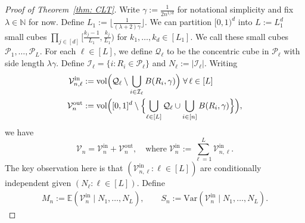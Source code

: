 \documentclass[11pt]{article}
\newcommand{\vol}{\mathrm{vol}}
\newcommand{\var}{\mathrm{Var}}
\begin{document}
\begin{proof}[Proof of Theorem~\ref{thm: CLT}]
Write $\gamma:=\frac{1}{2n^{1/d}}$ for notational simplicity and fix $\lambda\in\mathbb{N}$ for now. Define $L_1:=\lfloor\frac{1}{(\lambda+2)\gamma}\rfloor$. We can partition $[0,1)^d$ into $L:=L_1^d$ small cubes $\prod_{j\in[d]} \bigl[\frac{k_j-1}{L_1}, \frac{k_j}{L_1}\bigr)$ for $k_1,\ldots,k_d\in[L_1]$. We call these small cubes $\mathcal{P}_1,\ldots,\mathcal{P}_L$. For each $\ell\in[L]$, we define $\mathcal{Q}_\ell$ to be the concentric cube in $\mathcal{P}_\ell$ with side length $\lambda\gamma$. Define $\mathcal{I}_\ell = \{i: R_i\in \mathcal{P}_\ell\}$ and $N_\ell:=|\mathcal{I}_\ell|$. Writing
\begin{equation}
\begin{aligned}
\mathcal{V}_{n,\ell}^{\mathrm{in}}&:= \vol \Bigl(\mathcal{Q}_\ell \setminus \bigcup_{i\in \mathcal{I}_\ell} B(R_i,\gamma)\Bigr) \; \forall\, \ell\in[L]\\
 \mathcal{V}_n^{\mathrm{out}}&:= \vol\Bigl([0,1]^d \setminus \Bigl\{\bigcup_{\ell\in[L]}\mathcal{Q}_\ell \cup\bigcup_{i\in[n]} B(R_i,\gamma) \Bigr\}\Bigr),
\end{aligned}
\label{eq:VInOut}
\end{equation}
we have 
\[  
\mathcal{V}_n = \mathcal{V}_{n}^{\mathrm{in}}+ \mathcal{V}_n^{\mathrm{out}}, \quad \text{where}\; \mathcal{V}_{n}^{\mathrm{in}} := \sum_{\ell=1}^L \mathcal{V}_{n,\ell}^{\mathrm{in}}.
\]
The key observation here is that $(\mathcal{V}_{n,\ell}^{\mathrm{in}}:\ell\in[L])$ are conditionally independent given $(N_\ell:\ell\in[L])$. Define 
\begin{align}\label{eq:MS}
    M_n:= \mathbb{E}(\mathcal{V}_n^{\mathrm{in}}\mid N_1,\ldots,N_L), \qquad S_n:= \var(\mathcal{V}_n^{\mathrm{in}}\mid N_1,\ldots,N_L).
\end{align}


\end{proof}
\end{document}
